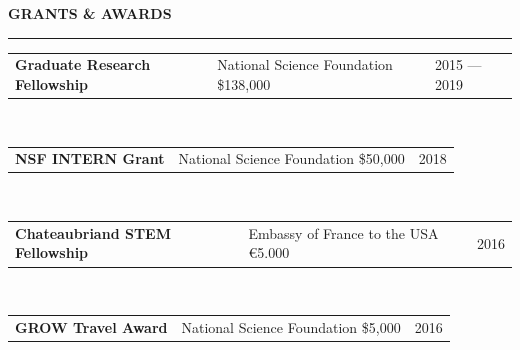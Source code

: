 \documentclass{cv} %
\begin{document}
\begin{minipage}{\textwidth}

\sectionskip
\MakeUppercase{\textbf{Grants \& Awards}}
  \sectionlineskip
  \hrule

\vspace{.5cm}



\begin{tabular}{@{}p{}p{}@{}p{}@{}}
  {\bf Graduate Research Fellowship}
  &
  {\footnotesize National Science Foundation \hfill \${138,000}\hspace{0.5cm}}
  &
  \hfill  {2015 --- 2019}
\end{tabular}
\\

\begin{tabular}{@{}p{}p{}@{}p{}@{}}
{\bf NSF INTERN Grant}
  &
{\footnotesize National Science Foundation \hfill \${50,000}\hspace{0.5cm}}
  &
 \hfill {2018}
\end{tabular}
\\

\begin{tabular}{@{}p{}p{}@{}p{}@{}}
{\bf Chateaubriand STEM Fellowship}
  &
{\footnotesize Embassy of France to the USA \hfill \euro{5.000} \hspace{0.5cm}}
  &
 \hfill {2016}
\end{tabular}
\\

\begin{tabular}{@{}p{}p{}@{}p{}@{}}
{\bf GROW Travel Award}
  &
 {\footnotesize National Science Foundation \hfill \${5,000}\hspace{0.5cm}}
  &
 \hfill {2016}
\end{tabular}
\\



\end{minipage}
\end{document}
